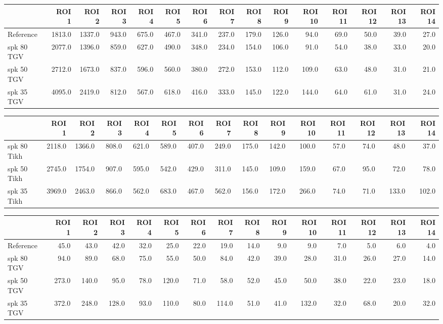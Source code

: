 \begin{tabular}{lrrrrrrrrrrrrrr}
\toprule
{} &   ROI 1 &   ROI 2 &  ROI 3 &  ROI 4 &  ROI 5 &  ROI 6 &  ROI 7 &  ROI 8 &  ROI 9 &  ROI 10 &  ROI 11 &  ROI 12 &  ROI 13 &  ROI 14 \\
\midrule
Reference   &  1813.0 &  1337.0 &  943.0 &  675.0 &  467.0 &  341.0 &  237.0 &  179.0 &  126.0 &    94.0 &    69.0 &    50.0 &    39.0 &    27.0 \\
 spk 80 TGV &  2077.0 &  1396.0 &  859.0 &  627.0 &  490.0 &  348.0 &  234.0 &  154.0 &  106.0 &    91.0 &    54.0 &    38.0 &    33.0 &    20.0 \\
 spk 50 TGV &  2712.0 &  1673.0 &  837.0 &  596.0 &  560.0 &  380.0 &  272.0 &  153.0 &  112.0 &   109.0 &    63.0 &    48.0 &    31.0 &    21.0 \\
 spk 35 TGV &  4095.0 &  2419.0 &  812.0 &  567.0 &  618.0 &  416.0 &  333.0 &  145.0 &  122.0 &   144.0 &    64.0 &    61.0 &    31.0 &    24.0 \\
\bottomrule
\end{tabular}
\begin{tabular}{lrrrrrrrrrrrrrr}
\toprule
{} &   ROI 1 &   ROI 2 &  ROI 3 &  ROI 4 &  ROI 5 &  ROI 6 &  ROI 7 &  ROI 8 &  ROI 9 &  ROI 10 &  ROI 11 &  ROI 12 &  ROI 13 &  ROI 14 \\
\midrule
 spk 80 Tikh &  2118.0 &  1366.0 &  808.0 &  621.0 &  589.0 &  407.0 &  249.0 &  175.0 &  142.0 &   100.0 &    57.0 &    74.0 &    48.0 &    37.0 \\
 spk 50 Tikh &  2745.0 &  1754.0 &  907.0 &  595.0 &  542.0 &  429.0 &  311.0 &  145.0 &  109.0 &   159.0 &    67.0 &    95.0 &    72.0 &    78.0 \\
 spk 35 Tikh &  3969.0 &  2463.0 &  866.0 &  562.0 &  683.0 &  467.0 &  562.0 &  156.0 &  172.0 &   266.0 &    74.0 &    71.0 &   133.0 &   102.0 \\
\bottomrule
\end{tabular}
\begin{tabular}{lrrrrrrrrrrrrrr}
\toprule
{} &  ROI 1 &  ROI 2 &  ROI 3 &  ROI 4 &  ROI 5 &  ROI 6 &  ROI 7 &  ROI 8 &  ROI 9 &  ROI 10 &  ROI 11 &  ROI 12 &  ROI 13 &  ROI 14 \\
\midrule
Reference   &   45.0 &   43.0 &   42.0 &   32.0 &   25.0 &   22.0 &   19.0 &   14.0 &    9.0 &     9.0 &     7.0 &     5.0 &     6.0 &     4.0 \\
 spk 80 TGV &   94.0 &   89.0 &   68.0 &   75.0 &   55.0 &   50.0 &   84.0 &   42.0 &   39.0 &    28.0 &    31.0 &    26.0 &    27.0 &    14.0 \\
 spk 50 TGV &  273.0 &  140.0 &   95.0 &   78.0 &  120.0 &   71.0 &   58.0 &   52.0 &   45.0 &    50.0 &    38.0 &    22.0 &    23.0 &    18.0 \\
 spk 35 TGV &  372.0 &  248.0 &  128.0 &   93.0 &  110.0 &   80.0 &  114.0 &   51.0 &   41.0 &   132.0 &    32.0 &    68.0 &    20.0 &    32.0 \\
\bottomrule
\end{tabular}
